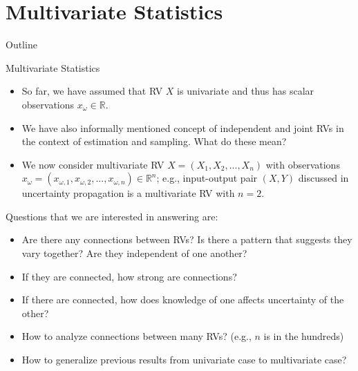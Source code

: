 \documentclass[9pt]{beamer}
\begin{document}
\section{Multivariate Statistics}
\begin{frame}{Outline}
\tableofcontents[currentsection]
\end{frame}

%
\begin{frame}{Multivariate Statistics}

\begin{itemize}
\setlength{\itemsep}{10pt}
\item So far, we have assumed that RV $X$ is univariate and thus has scalar observations $x_\omega \in \mathbb{R}$.  

\item We have also informally mentioned concept of independent and joint RVs in the context of estimation and sampling.  What do these mean?

\item We now consider multivariate RV $X=(X_1,X_2,...,X_n)$ with observations $x_\omega=(x_{\omega,1},x_{\omega,2},...,x_{\omega,n})\in \mathbb{R}^n$; e.g., input-output pair $(X,Y)$ discussed in uncertainty propagation is a multivariate RV with $n=2$.
 
\end{itemize}

Questions that we are interested in answering are:
\begin{block}{}
\begin{itemize}
\setlength{\itemsep}{5pt}
\item Are there any connections between RVs? Is there a pattern that suggests they vary together? Are they independent of one another?
\item If they are connected, how strong are connections?
\item If there are connected, how does knowledge of one affects uncertainty of the other? 
\item How to analyze connections between many RVs? (e.g., $n$ is in the hundreds)
\item How to generalize previous results from univariate case to multivariate case? 
\end{itemize}
\end{block}

\end{frame}
\end{document}
